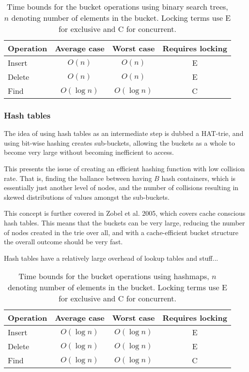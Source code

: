 \begin{table}[h!]
    \centering
    \begin{tabular}[here]{ l || c | c | c}
        Operation & Average case & Worst case & Requires locking  \\ \hline
        Insert    & $O(n)$ & $O(n)$           & E \\ \hline
        Delete    & $O(n)$ & $O(n)$           & E \\ \hline
        Find      & $O(\log n)$ & $O(\log n)$ & C  \\ \hline
    \end{tabular}
    \caption{Time bounds for the bucket operations using binary search trees,
    $n$ denoting number of elements in the bucket. Locking terms use E for
        exclusive and C for concurrent.}
    \label{tab:bounds:sortedarray}
\end{table}


\subsubsection{Hash tables}
The idea of using hash tables as an intermediate step is dubbed a HAT-trie,
and using bit-wise hashing creates sub-buckets, allowing the buckets
as a whole to become very large without becoming inefficient to access.

This presents the issue of creating an efficient hashing function with
low collision rate. That is, finding the ballance between having $B$
hash containers, which is essentially just another level of nodes, and
the number of collisions resulting in skewed distributions of values amongst
the sub-buckets. 

This concept is further covered in Zobel et al. 2005, which covers cache conscious
hash tables. This means that the buckets can be very large, reducing the number of
nodes created in the trie over all, and with a cache-efficient bucket structure
the overall outcome should be very fast.


Hash tables have a relatively large overhead of lookup tables and stuff...

\begin{table}[h!]
    \centering
    \begin{tabular}[here]{ l || c | c | c}
        Operation & Average case & Worst case & Requires locking  \\ \hline
        Insert    & $O(\log n)$ & $O(\log n)$ & E \\ \hline
        Delete    & $O(\log n)$ & $O(\log n)$ & E \\ \hline
        Find      & $O(\log n)$ & $O(\log n)$ & C \\ \hline
    \end{tabular}
    \caption{Time bounds for the bucket operations using hashmaps,
    $n$ denoting number of elements in the bucket. Locking terms use E for
        exclusive and C for concurrent.}

    \label{tab:bounds:hashmap}
\end{table}

